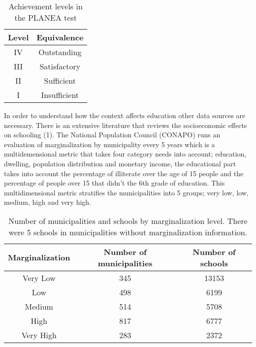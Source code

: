 \documentclass[9pt,twocolumn,twoside,]{pnas-new}
\begin{document}
\begin{table}[H]
  \centering
  \begin{tabular}{|c|c|}
  \hline
  Level & Equivalence \\ \hline
  IV                       & Outstanding                       \\ \hline
  III                       & Satisfactory                       \\ \hline
  II                       & Sufficient                       \\ \hline
  I                       & Insufficient                       \\ \hline
  \end{tabular}
\caption{Achievement levels in the PLANEA test}
\label{table:levels}
\end{table}

In order to understand how the context affects education other data
sources are necessary. There is an extensive literature that reviews the
socioeconomic effects on schooling (1). The National Population Council
(CONAPO) runs an evaluation of marginalization by municipality every 5
years which is a multidemensional metric that takes four category needs
into account; education, dwelling, population distribution and monetary
income, the educational part takes into account the percentage of
illiterate over the age of 15 people and the percentage of people over
15 that didn't the 6th grade of education. This multidimensional metric
stratifies the municipalities into 5 groups; very low, low, medium, high
and very high.

\begin{table}[H]
     \centering
     \begin{tabular}{|c|c|c|}
     \hline
     Marginalization & Number of municipalities & Number of schools\\ \hline
     Very Low & 345 & 13153\\ \hline
     Low & 498 & 6199\\ \hline
     Medium & 514 & 5708\\ \hline
     High & 817 & 6777\\ \hline
     Very High & 283 & 2372\\ \hline
     \end{tabular}
     \caption{Number of municipalities and schools by marginalization level. There were 5 schools in municipalities without marginalization information.}
     \label{tab:marginalization}
\end{table}
\end{document}

